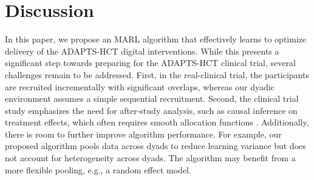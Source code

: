 
\section{Discussion}


In this paper, we propose an MARL algorithm that effectively learns to optimize delivery of the ADAPTS-HCT digital interventions. While this presents a significant step towards preparing for the ADAPTS-HCT clinical trial, several challenges remain to be addressed. First, in the real-clinical trial, the participants are recruited incrementally with significant overlaps, whereas our dyadic environment assumes a simple sequential recruitment. Second, the clinical trial study emphasizes the need for after-study analysis, such as causal inference on treatment effects, which often requires smooth allocation functions \cite{zhang2024replicable}. Additionally, there is room to further improve algorithm performance. For example, our proposed algorithm pools data across dyads to reduce learning variance but does not account for heterogeneity across dyads. The algorithm may benefit from a more flexible pooling, e.g., a random effect model.



